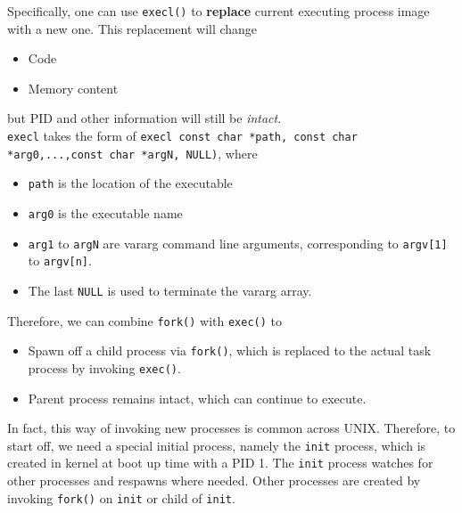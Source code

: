\documentclass[11pt]{article}
\theoremstyle{definition}
\begin{document}
Specifically, one can use \texttt{execl()} to \textbf{replace} current executing process image with a new one. This replacement will change 
\begin{itemize}[itemsep=0pt]
  \item Code
  \item Memory content
\end{itemize}
but PID and other information will still be \textit{intact}.\\
\texttt{execl} takes the form of \texttt{execl const char *path, const char *arg0,...,const char *argN, NULL)}, where
\begin{itemize}[itemsep=0pt]
  \item \texttt{path} is the location of the executable
  \item \texttt{arg0} is the executable name
  \item \texttt{arg1} to \texttt{argN} are vararg command line arguments, corresponding to \texttt{argv[1]} to \texttt{argv[n]}.
  \item The last \texttt{NULL} is used to terminate the vararg array.
\end{itemize}
Therefore, we can combine \texttt{fork()} with \texttt{exec()} to
\begin{itemize}[itemsep=0pt]
  \item Spawn off a child process via \texttt{fork()}, which is replaced to the actual task process by invoking \texttt{exec()}.
  \item Parent process remains intact, which can continue to execute.
\end{itemize}
In fact, this way of invoking new processes is common across UNIX. Therefore, to start off, we need a special initial process, namely the \texttt{init} process, which is created in kernel at boot up time with a PID 1. The \texttt{init} process watches for other processes and respawns where needed. Other processes are created by invoking \texttt{fork()} on \texttt{init} or child of \texttt{init}. 
\end{document}
